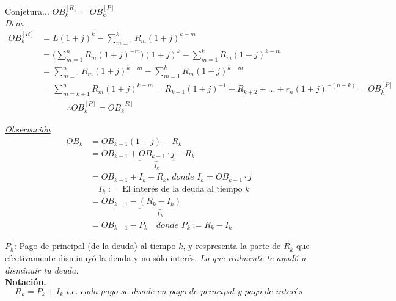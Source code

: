 Conjetura... $OB_k^{[R]} = OB_k^{[P]}$\\
\underline{\textit{Dem.}} \\
\begin{align*}
    OB_k^{[R]} &= L(1+j)^k - \sum_{m=1}^k R_m(1+j)^{k-m}\\
    &= \big( \sum_{m=1}^n R_m(1+j)^{-m} \big) (1+j)^k - \sum_{m=1}^k R_m(1+j)^{k-m}\\
    &= \sum_{m=1}^n R_m(1+j)^{k-m} - \sum_{m=1}^k R_m(1+j)^{k-m}\\
    &= \sum_{m=k+1}^n R_m(1+j)^{k-m} = R_{k+1}(1+j)^{-1} + R_{k+2} + ... + r_n(1+j)^{-(n-k)} = OB_k^{[P]}\\
    &\quad\quad\quad \therefore OB_k^{[P]} = OB_k^{[R]}
\end{align*}

\textit{\underline{Observación}}
\begin{align*}
    OB_k &= OB_{k-1}(1+j) - R_k\\
    &= OB_{k-1} + \underbrace{OB_{k-1}\cdot j}_{I_k} - R_k\\
    &= OB_{k-1} + I_k - R_k \textit{, donde }I_k=OB_{k-1}\cdot j\\
    & \quad I_k := \text{ El interés de la deuda al tiempo }k\\
    &= OB_{k-1} - \underbrace{(R_k-I_k)}_{P_k}\\
    &= OB_{k-1} - P_k \quad \textit{donde }P_k := R_k - I_k
\end{align*}

$P_k$: Pago de principal (de la deuda) al tiempo $k$, y respresenta la parte de $R_k$ que efectivamente disminuyó la deuda y no sólo interés. \textit{Lo que realmente te ayudó a disminuir tu deuda.}\\

\textbf{Notación.} \\
$$R_k = P_k + I_k \textit{ i.e. cada pago se divide en pago de principal y pago de interés}$$

